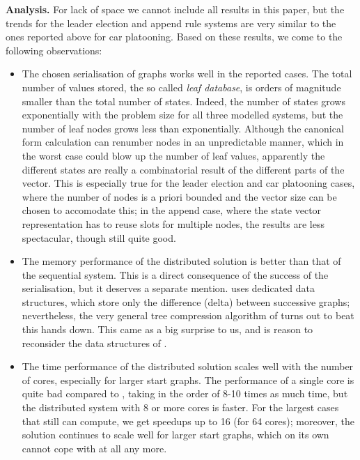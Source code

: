 \medskip\noindent\textbf{Analysis.}\enspace
%
For lack of space we cannot include all results in this paper, but the trends
for the leader election and append rule systems are very similar to the ones
reported above for car platooning. Based on these results, we come to the
following observations:

\begin{itemize}
\item The chosen serialisation of graphs works well in the reported cases. The
  total number of values stored, the so called \emph{leaf database}, is orders 
  of magnitude smaller than the total number of
  states. Indeed, the number of states grows exponentially with the problem
  size for all three modelled systems, but the number of leaf nodes grows less
  than exponentially. Although the canonical form calculation can renumber
  nodes in an unpredictable manner, which in the worst case could blow up the
  number of leaf values, apparently the different states are really a
  combinatorial result of the different parts of the vector. This is especially
  true for the leader election and car platooning cases, where the number of
  nodes is a priori bounded and the vector size can be chosen to accomodate
  this; in the append case, where the state vector representation has to reuse
  slots for multiple nodes, the results are less spectacular, though still
  quite good.

\item The memory performance of the distributed \LTSMIN solution is better than
  that of the sequential \GROOVE system. This is a direct consequence of the
  success of the serialisation, but it deserves a separate mention. \GROOVE
  uses dedicated data structures, which store only the difference (delta)
  between successive graphs; nevertheless, the very general tree compression
  algorithm of \LTSMIN turns out to beat this hands down. This came as a big
  surprise to us, and is reason to reconsider the data structures of
  \GROOVE.

\item The time performance of the distributed \LTSMIN solution scales well with
  the number of cores, especially for larger start graphs. The performance of a
  single core is quite bad compared to \GROOVE, taking in the order of 8-10
  times as much time, but the distributed system with 8 or more cores is
  faster. For the largest cases that \GROOVE still can compute, we get speedups
  up to 16 (for 64 cores); moreover, the \LTSMIN solution continues to
  scale well for larger start graphs, which \GROOVE on its own cannot cope with
  at all any more.


\end{itemize}

